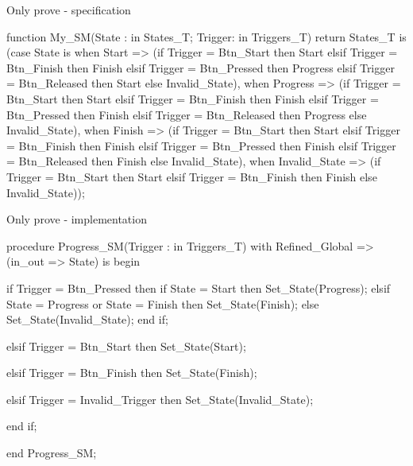 \documentclass{beamer}
\begin{document}
\begin{frame}[fragile]{Only prove - specification}
  \begin{pxcode}[language=SPARK,style=magic,gobble=3]
   function My_SM(State : in States_T; Trigger: in Triggers_T)
                  return States_T is
     (case State is
         when Start =>
         (if    Trigger = Btn_Start    then Start
          elsif Trigger = Btn_Finish   then Finish
          elsif Trigger = Btn_Pressed  then Progress
          elsif Trigger = Btn_Released then Start
          else                              Invalid_State),
         when Progress =>
         (if    Trigger = Btn_Start    then Start
          elsif Trigger = Btn_Finish   then Finish
          elsif Trigger = Btn_Pressed  then Finish
          elsif Trigger = Btn_Released then Progress
          else                              Invalid_State),
         when Finish =>
         (if    Trigger = Btn_Start    then Start
          elsif Trigger = Btn_Finish   then Finish
          elsif Trigger = Btn_Pressed  then Finish
          elsif Trigger = Btn_Released then Finish
          else                              Invalid_State),
         when Invalid_State =>
         (if    Trigger = Btn_Start    then Start
          elsif Trigger = Btn_Finish   then Finish
          else                              Invalid_State));

  \end{pxcode}
\end{frame}
\begin{frame}[fragile]{Only prove - implementation}
  \begin{pxcode}[language=SPARK,style=magic,gobble=3]
   procedure Progress_SM(Trigger : in Triggers_T)
     with Refined_Global => (in_out => State)
   is
   begin

      if Trigger = Btn_Pressed then
         if State = Start then
            Set_State(Progress);
         elsif State = Progress or State = Finish then
            Set_State(Finish);
         else
            Set_State(Invalid_State);
         end if;

      elsif Trigger = Btn_Start then
         Set_State(Start);

      elsif Trigger = Btn_Finish then
         Set_State(Finish);

      elsif Trigger = Invalid_Trigger then
         Set_State(Invalid_State);

      end if;

   end Progress_SM;
  \end{pxcode}
\end{frame}
\end{document}
